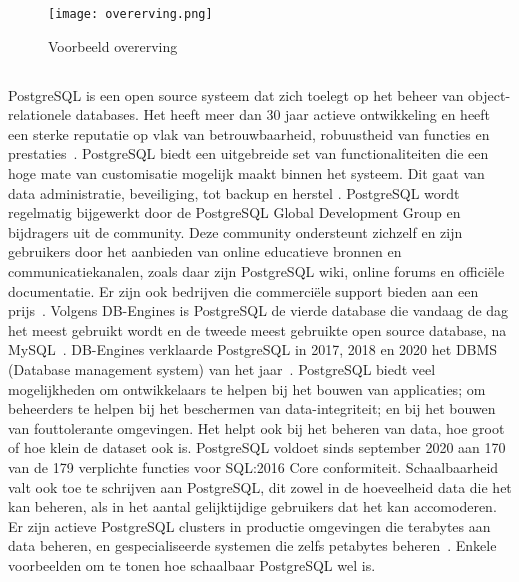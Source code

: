 \begin{figure}[!h]
    \centering
    \texttt{[image: overerving.png]}
    \caption{Voorbeeld overerving}
    \label{fig:Voorbeeld overerving}
\end{figure}


\subsection{}
\label{subsec:PostgreSQL}


PostgreSQL is een open source systeem dat zich toelegt op het beheer van object-relationele databases. Het heeft meer dan 30 jaar actieve ontwikkeling en heeft een sterke reputatie op vlak van betrouwbaarheid, robuustheid van functies en prestaties~\autocite{postgres}. PostgreSQL biedt een uitgebreide set van functionaliteiten die een hoge mate van customisatie mogelijk maakt binnen het systeem. Dit gaat van data administratie, beveiliging, tot backup en herstel . PostgreSQL wordt regelmatig bijgewerkt door de PostgreSQL Global Development Group en bijdragers uit de community. Deze community ondersteunt zichzelf en zijn gebruikers door het aanbieden van online educatieve bronnen en communicatiekanalen, zoals daar zijn PostgreSQL wiki, online forums en officiële documentatie. Er zijn ook bedrijven die commerciële support bieden aan een prijs~\autocite{Nethosting2019}. Volgens DB-Engines is PostgreSQL de vierde database die vandaag de dag het meest gebruikt wordt en de tweede meest gebruikte open source database, na MySQL~\autocite{DBEngines2021}. DB-Engines verklaarde PostgreSQL in 2017, 2018 en 2020 het DBMS (Database management system) van het jaar~\autocite{DBEngines2021a}.
PostgreSQL biedt veel mogelijkheden om ontwikkelaars te helpen bij het bouwen van applicaties; om beheerders te helpen bij het beschermen van data-integriteit; en bij het bouwen van fouttolerante omgevingen. Het helpt ook bij het beheren van data, hoe groot of hoe klein de dataset ook is. PostgreSQL voldoet sinds september 2020 aan 170 van de 179 verplichte functies voor SQL:2016 Core conformiteit. Schaalbaarheid valt ook toe te schrijven aan PostgreSQL, dit zowel in de hoeveelheid data die het kan beheren, als in het aantal gelijktijdige gebruikers dat het kan accomoderen. Er zijn actieve PostgreSQL clusters in productie omgevingen die terabytes aan data beheren, en gespecialiseerde systemen die zelfs petabytes beheren~\autocite{PostgreSQL2021}. Enkele voorbeelden om te tonen hoe schaalbaar PostgreSQL wel is.

